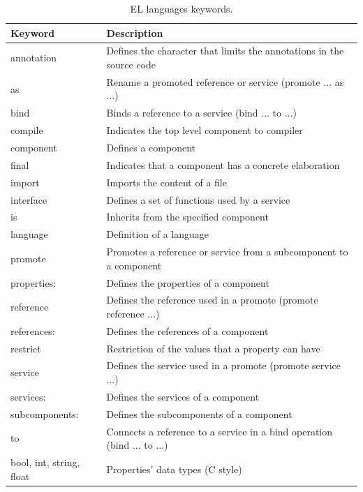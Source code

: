 \documentclass[11pt]{report}
\begin{document}
		
		\begin{table}[H]
			\centering
			\caption{EL languages keywords.}
			\label{tab:keywords}
			\begin{tabular}{l|l}
				\hline 
				\textbf{Keyword} & \textbf{Description} \\
				\hline
				annotation & Defines the character that limits the annotations in the source code \\
				
				as & Rename a promoted reference or service (promote ... as ...)\\
				
				bind & Binds a reference to a service (bind ... to ...)\\
				
				compile & Indicates the top level component to compiler\\
				
				component & Defines a component \\
				
				final & Indicates that a component has a concrete elaboration \\
				
				import & Imports the content of a file \\
				
				interface & Defines a set of functions used by a service \\
				
				is & Inherits from the specified component \\
				
				language & Definition of a language \\
				
				promote & Promotes a reference or service from a subcomponent to a component \\
				
				properties: & Defines the properties of a component \\
				
				reference & Defines the reference used in a promote (promote reference ...)\\
				
				references: & Defines the references of a component \\
				
				restrict & Restriction of the values that a property can have \\
				
				service & Defines the service used in a promote (promote service ...)\\
				
				services: & Defines the services of a component \\
				
				subcomponents: & Defines the subcomponents of a component \\
				
				to & Connects a reference to a service in a bind operation (bind ... to ...)\\
				\hline
				bool, int, string, float & Properties' data types (C style) \\
				\hline
			\end{tabular}
		\end{table}
		
\end{document}
